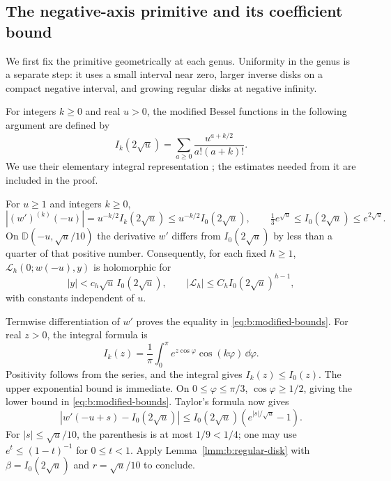 \subsection{The negative-axis primitive and its coefficient bound}
\label{subsec:b:primitives}

We first fix the primitive geometrically at each genus. Uniformity
in the genus is a separate step: it uses a small interval near zero,
larger inverse disks on a compact negative interval, and growing
regular disks at negative infinity.

For integers $k\geq0$ and real $u>0$, the modified Bessel functions
in the following argument are defined by
\begin{equation}\label{eq:b:modified-bessel}
 I_k(2\sqrt u)=\sum_{a\geq0}\frac{u^{a+k/2}}{a!(a+k)!}.
\end{equation}
We use their elementary integral representation
\cite[(10.25.2), (10.32.3)]{DLMF}; the estimates needed from it
are included in the proof.

\begin{lmm}\label{lmm:b:growing-disks}
For $u\geq1$ and integers $k\geq0$,
\begin{equation}\label{eq:b:modified-bounds}
 |(w')^{(k)}(-u)|=u^{-k/2}I_k(2\sqrt u)
                  \leq u^{-k/2}I_0(2\sqrt u),\qquad
 \tfrac13e^{\sqrt u}\leq I_0(2\sqrt u)\leq e^{2\sqrt u}.
\end{equation}
On $\mathbb D(-u,\sqrt u/10)$ the derivative $w'$ differs
from $I_0(2\sqrt u)$ by less than a quarter of that positive
number. Consequently, for each fixed $h\geq1$,
$\mathcal L_h(0;w(-u),y)$ is holomorphic for
\begin{equation}\label{eq:b:growing-radius}
 |y|<c_h\sqrt u\,I_0(2\sqrt u),
 \qquad |\mathcal L_h|\leq C_h I_0(2\sqrt u)^{h-1},
\end{equation}
with constants independent of $u$.
\end{lmm}
\begin{prf}
Termwise differentiation of $w'$ proves the equality in
\eqref{eq:b:modified-bounds}. For real $z>0$, the integral formula
is
\[
 I_k(z)=\frac1\pi\int_0^\pi e^{z\cos\varphi}
                                      \cos(k\varphi)\,\dd\varphi.
\]
Positivity follows from the series, and the integral gives
$I_k(z)\leq I_0(z)$. The upper exponential bound is immediate.
On $0\leq\varphi\leq\pi/3$, $\cos\varphi\geq1/2$, giving the
lower bound in \eqref{eq:b:modified-bounds}.
Taylor's formula now gives
\[
 |w'(-u+s)-I_0(2\sqrt u)|
       \leq I_0(2\sqrt u)(e^{|s|/\sqrt u}-1).
\]
For $|s|\leq\sqrt u/10$, the parenthesis is at most $1/9<1/4$;
one may use $e^t\leq(1-t)^{-1}$ for $0\leq t<1$.
Apply Lemma~\ref{lmm:b:regular-disk} with
$\beta=I_0(2\sqrt u)$ and $r=\sqrt u/10$ to conclude.
\end{prf}

